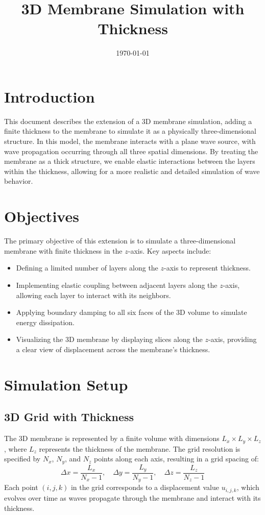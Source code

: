 \documentclass{article}
\title{3D Membrane Simulation with Thickness}
\author{}
\date{\today}
\begin{document}
\maketitle

\section{Introduction}

This document describes the extension of a 3D membrane simulation, adding a finite thickness to the membrane to simulate it as a physically three-dimensional structure. In this model, the membrane interacts with a plane wave source, with wave propagation occurring through all three spatial dimensions. By treating the membrane as a thick structure, we enable elastic interactions between the layers within the thickness, allowing for a more realistic and detailed simulation of wave behavior.

\section{Objectives}

The primary objective of this extension is to simulate a three-dimensional membrane with finite thickness in the $z$-axis. Key aspects include:
\begin{itemize}
    \item Defining a limited number of layers along the $z$-axis to represent thickness.
    \item Implementing elastic coupling between adjacent layers along the $z$-axis, allowing each layer to interact with its neighbors.
    \item Applying boundary damping to all six faces of the 3D volume to simulate energy dissipation.
    \item Visualizing the 3D membrane by displaying slices along the $z$-axis, providing a clear view of displacement across the membrane’s thickness.
\end{itemize}

\section{Simulation Setup}

\subsection{3D Grid with Thickness}

The 3D membrane is represented by a finite volume with dimensions $L_x \times L_y \times L_z$, where $L_z$ represents the thickness of the membrane. The grid resolution is specified by $N_x$, $N_y$, and $N_z$ points along each axis, resulting in a grid spacing of:
\[
\Delta x = \frac{L_x}{N_x - 1}, \quad \Delta y = \frac{L_y}{N_y - 1}, \quad \Delta z = \frac{L_z}{N_z - 1}
\]
Each point $(i, j, k)$ in the grid corresponds to a displacement value $u_{i, j, k}$, which evolves over time as waves propagate through the membrane and interact with its thickness.
\end{document}
